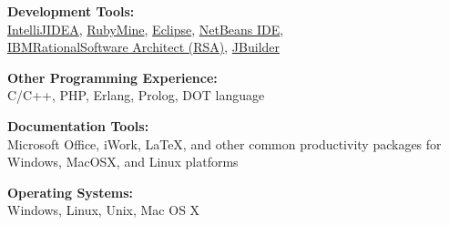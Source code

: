{\textbf{Development Tools:}}\\
\href{http://www.jetbrains.com/idea/}{IntelliJ\textregistered\space IDEA},
\href{http://www.jetbrains.com/ruby}{RubyMine\texttrademark},
\href{http://www.eclipse.org/}{Eclipse},
\href{http://netbeans.org/}{NetBeans IDE}, \\
\href{http://www.ibm.com/developerworks/rational/products/rsa/}{IBM\textregistered\space Rational\textregistered\space Software Architect (RSA)},
\href{http://www.embarcadero.com/products/jbuilder}{JBuilder}

\blankline

{\textbf{Other Programming Experience:}}\\
C/C++, PHP, Erlang, Prolog, DOT language

\blankline

{\textbf{Documentation Tools:}}\\ 
Microsoft Office, iWork, \LaTeX{}, 
and other common productivity packages for Windows, Mac\nolinebreak\space OS\nolinebreak\space X, and
Linux platforms

\blankline

{\textbf{Operating Systems:}}\\
Windows, Linux, Unix, Mac OS X\\
